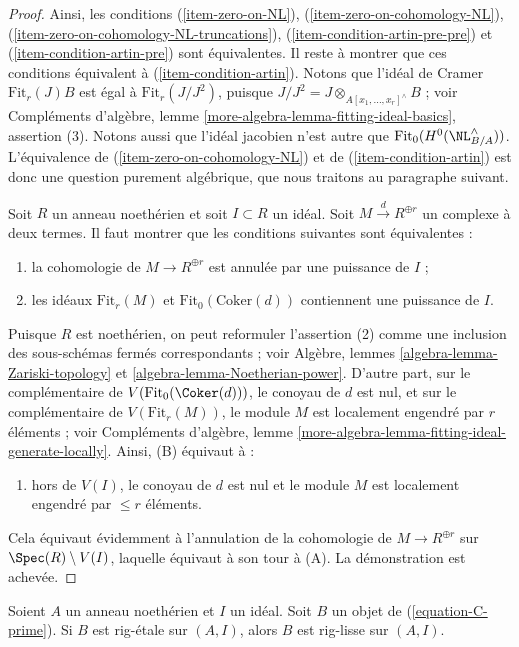 \begin{proof}
\medskip\noindent
Ainsi, les conditions
(\ref{item-zero-on-NL}),
(\ref{item-zero-on-cohomology-NL}),
(\ref{item-zero-on-cohomology-NL-truncations}),
(\ref{item-condition-artin-pre-pre}) et
(\ref{item-condition-artin-pre}) sont équivalentes. Il reste à montrer que ces
conditions équivalent à (\ref{item-condition-artin}). Notons que l'idéal de
Cramer $\text{Fit}_r(J) B$ est égal à $\text{Fit}_r(J/J^2)$, puisque
$J/J^2 = J \otimes_{A[x_1, \ldots, x_r]^\wedge} B$ ; voir Compléments
d'algèbre, lemme \ref{more-algebra-lemma-fitting-ideal-basics}, assertion (3).
Notons aussi que l'idéal jacobien n'est autre que
$\text{Fit}_0(H^0(\NL_{B/A}^\wedge))$. L'équivalence de
(\ref{item-zero-on-cohomology-NL}) et de (\ref{item-condition-artin}) est donc
une question purement algébrique, que nous traitons au paragraphe suivant.

\medskip\noindent
Soit $R$ un anneau noethérien et soit $I \subset R$ un idéal. Soit
$M \xrightarrow{d} R^{\oplus r}$ un complexe à deux termes. Il faut montrer
que les conditions suivantes sont équivalentes :
\begin{enumerate}
\item[(A)] la cohomologie de $M \to R^{\oplus r}$ est annulée par une
puissance de $I$ ;
\item[(B)] les idéaux $\text{Fit}_r(M)$ et $\text{Fit}_0(\text{Coker}(d))$
contiennent une puissance de $I$.
\end{enumerate}
Puisque $R$ est noethérien, on peut reformuler l'assertion (2) comme une
inclusion des sous-schémas fermés correspondants ; voir Algèbre, lemmes
\ref{algebra-lemma-Zariski-topology} et \ref{algebra-lemma-Noetherian-power}.
D'autre part, sur le complémentaire de $V(\text{Fit}_0(\Coker(d)))$, le
conoyau de $d$ est nul, et sur le complémentaire de $V(\text{Fit}_r(M))$, le
module $M$ est localement engendré par $r$ éléments ; voir Compléments
d'algèbre, lemme \ref{more-algebra-lemma-fitting-ideal-generate-locally}.
Ainsi, (B) équivaut à :
\begin{enumerate}
\item[(C)] hors de $V(I)$, le conoyau de $d$ est nul et le module $M$ est
localement engendré par $\leq r$ éléments.
\end{enumerate}
Cela équivaut évidemment à l'annulation de la cohomologie de
$M \to R^{\oplus r}$ sur $\Spec(R) \setminus V(I)$, laquelle équivaut à son
tour à (A). La démonstration est achevée.
\end{proof}

\begin{lemma}
\label{lemma-rig-etale-rig-smooth}
Soient $A$ un anneau noethérien et $I$ un idéal. Soit $B$ un objet de
(\ref{equation-C-prime}). Si $B$ est rig-étale sur $(A, I)$, alors $B$ est
rig-lisse sur $(A, I)$.
\end{lemma}

